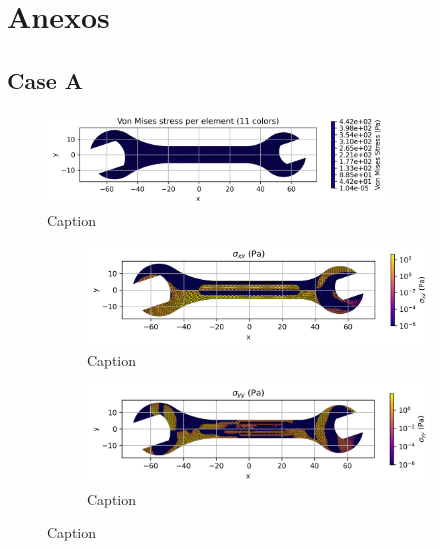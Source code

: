 \section{Anexos}

\subsection{Case A}

\begin{figure}[H]
    \centering
    \includegraphics[width=0.8\textwidth]{GRAFICOS/Case a_von_mises_per_element_11_colors.png}
    \caption{Caption}
    \label{fig:strain}
  \end{figure}

  \begin{figure}[H]
    \centering
    \begin{subfigure}[t]{0.49\textwidth}
      \centering
      \includegraphics[width=\textwidth]{GRAFICOS/Case a - sigma_xx_per_element.png}
      \caption{Caption}
      \label{fig:deformada_reacciones}
    \end{subfigure}
    \hfill
    \begin{subfigure}[t]{0.49\textwidth}
      \centering
      \includegraphics[width=\textwidth]{GRAFICOS/Case a - sigma_yy_per_element.png}
      \caption{Caption}
      \label{fig:von_mises}
    \end{subfigure}
    \caption{Caption}
    \label{fig:analisis_estructural}
  \end{figure}

